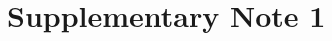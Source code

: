 \documentclass[11pt]{article}
\begin{document}
\maketitle

\section*{Supplementary Note 1}



%
%
\end{document}

